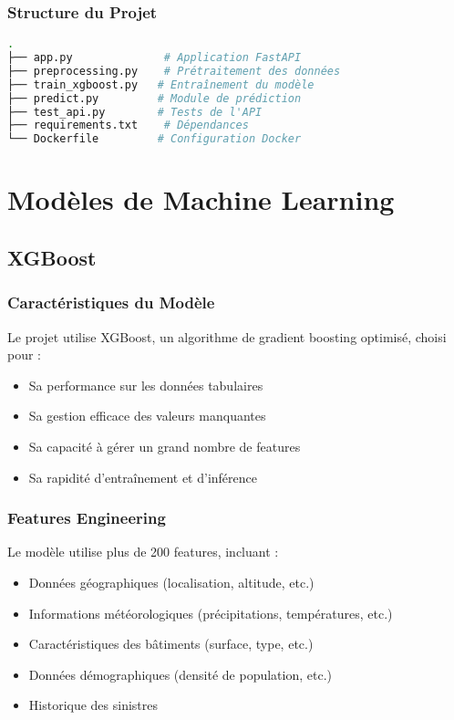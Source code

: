 \documentclass[12pt,a4paper]{report}
\begin{document}
\subsection{Structure du Projet}
\begin{lstlisting}[language=bash]
.
├── app.py              # Application FastAPI
├── preprocessing.py    # Prétraitement des données
├── train_xgboost.py   # Entraînement du modèle
├── predict.py         # Module de prédiction
├── test_api.py        # Tests de l'API
├── requirements.txt    # Dépendances
└── Dockerfile         # Configuration Docker
\end{lstlisting}

\chapter{Modèles de Machine Learning}
\section{XGBoost}
\subsection{Caractéristiques du Modèle}
Le projet utilise XGBoost, un algorithme de gradient boosting optimisé, choisi pour :
\begin{itemize}
    \item Sa performance sur les données tabulaires
    \item Sa gestion efficace des valeurs manquantes
    \item Sa capacité à gérer un grand nombre de features
    \item Sa rapidité d'entraînement et d'inférence
\end{itemize}

\subsection{Features Engineering}
Le modèle utilise plus de 200 features, incluant :
\begin{itemize}
    \item Données géographiques (localisation, altitude, etc.)
    \item Informations météorologiques (précipitations, températures, etc.)
    \item Caractéristiques des bâtiments (surface, type, etc.)
    \item Données démographiques (densité de population, etc.)
    \item Historique des sinistres
\end{itemize}
\end{document}
